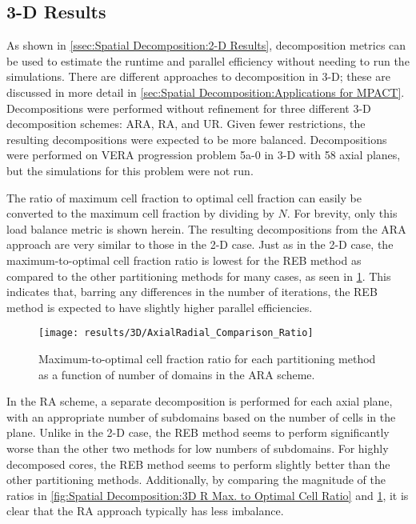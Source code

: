 {{    \subsection{3-D Results}{\label{ssec:Spatial Decomposition:3-D Results}
      As shown in \cref{ssec:Spatial Decomposition:2-D Results}, decomposition metrics can be used to estimate the runtime and parallel efficiency without needing to run the simulations.
      There are different approaches to decomposition in 3-D; these are discussed in more detail in \cref{sec:Spatial Decomposition:Applications for MPACT}.
      Decompositions were performed without refinement for three different 3-D decomposition schemes:  \ac{ARA}, \ac{RA}, and \ac{UR}.
      Given fewer restrictions, the resulting decompositions were expected to be more balanced.
      Decompositions were performed on VERA progression problem 5a-0 in 3-D \cite{VERAProblems} with 58 axial planes, but the simulations for this problem were not run.

      The ratio of maximum cell fraction to optimal cell fraction can easily be converted to the maximum cell fraction by dividing by $N$.
      For brevity, only this load balance metric is shown herein.
      The resulting decompositions from the \ac{ARA} approach are very similar to those in the 2-D case.
      Just as in the 2-D case, the maximum-to-optimal cell fraction ratio is lowest for the \ac{REB} method as compared to the other partitioning methods for many cases, as seen in \cref{fig:Spatial Decomposition:3D AR Max. to Optimal Cell Ratio}.
      This indicates that, barring any differences in the number of iterations, the \ac{REB} method is expected to have slightly higher parallel efficiencies.

      \begin{figure}
        \centering
        \texttt{[image: results/3D/AxialRadial\_Comparison\_Ratio]}
        \caption{Maximum-to-optimal cell fraction ratio for each partitioning method as a function of number of domains in the \acf{ARA} scheme. \label{fig:Spatial Decomposition:3D AR Max. to Optimal Cell Ratio}}
      \end{figure}

      In the \ac{RA} scheme, a separate decomposition is performed for each axial plane, with an appropriate number of subdomains based on the number of cells in the plane.
      Unlike in the 2-D case, the \ac{REB} method seems to perform significantly worse than the other two methods for low numbers of subdomains.
      For highly decomposed cores, the \ac{REB} method seems to perform slightly better than the other partitioning methods.
      Additionally, by comparing the magnitude of the ratios in \cref{fig:Spatial Decomposition:3D R Max. to Optimal Cell Ratio} and \cref{fig:Spatial Decomposition:3D AR Max. to Optimal Cell Ratio}, it is clear that the \ac{RA} approach typically has less imbalance.

}}}
